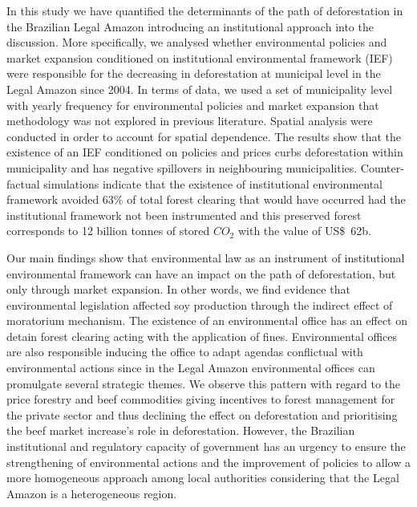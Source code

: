 In this study we have quantified the determinants of the path of deforestation in the Brazilian Legal Amazon introducing an institutional approach into the discussion. More specifically, we analysed whether environmental policies and market expansion conditioned on institutional environmental framework (IEF) were responsible for the decreasing in deforestation at municipal level in the Legal Amazon since 2004. In terms of data, we used a set of municipality level with yearly frequency for environmental policies and market expansion that methodology was not explored in previous literature. Spatial analysis were conducted in order to account for spatial dependence. The results show that the existence of an IEF conditioned on policies and prices curbs deforestation within municipality and has negative spillovers in neighbouring municipalities.  Counter-factual simulations indicate that the existence of institutional environmental framework avoided 63$\%$ of total forest clearing that would have occurred had the institutional framework not been instrumented and this preserved forest corresponds to 12 billion tonnes of stored $CO_{2}$ with the value of US\$\ 62b.

Our main findings show that environmental law as an instrument of institutional environmental framework can have an impact on the path of deforestation, but only through market expansion. In other words, we find evidence that environmental legislation affected soy production through the indirect effect of moratorium mechanism.  The existence of an environmental office has an effect on detain forest clearing acting with the application of fines. 
Environmental offices are also responsible inducing the office to adapt agendas conflictual with environmental actions since in the Legal Amazon environmental offices can promulgate several strategic themes. We observe this pattern with regard to the price forestry and beef commodities giving incentives to forest management for the private sector and thus declining the effect on deforestation and prioritising the beef market increase's role in deforestation. However, the Brazilian institutional and regulatory capacity of government has an urgency to ensure the strengthening of environmental actions and the improvement of policies to allow a more homogeneous approach among local authorities considering that the Legal Amazon is a heterogeneous region.

